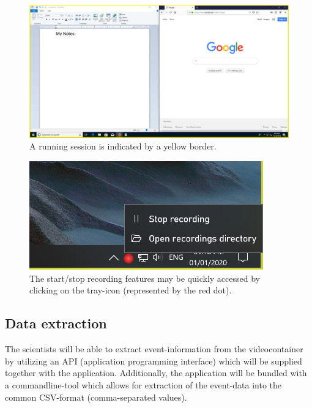 \begin{figure}[h!]
  \includegraphics[width=1.00\textwidth]{resources/ui_recordindicator.jpg}
  \centering
  \caption{A running \gls{session} is indicated by a yellow border.}
  \label{fig:sm_ui_recordindicator}
\end{figure}
\begin{figure}[h!]
  \includegraphics[width=0.90\textwidth]{resources/ui_tray_cropped.png}
  \centering
  \caption{The start/stop recording features may be quickly accessed by clicking on the tray-icon (represented by the red dot).}
  \label{fig:sm_ui_trayicon}
\end{figure}

\subsection{Data extraction}
\label{sec:sm_extraction}
The \glspl{scientist} will be able to extract \gls{event}-information from the videocontainer by utilizing an API (application programming interface) which will be supplied together with the application. Additionally, the application will be bundled with a commandline-tool which allows for extraction of the \gls{event}-data into the common CSV-format (comma-separated values).